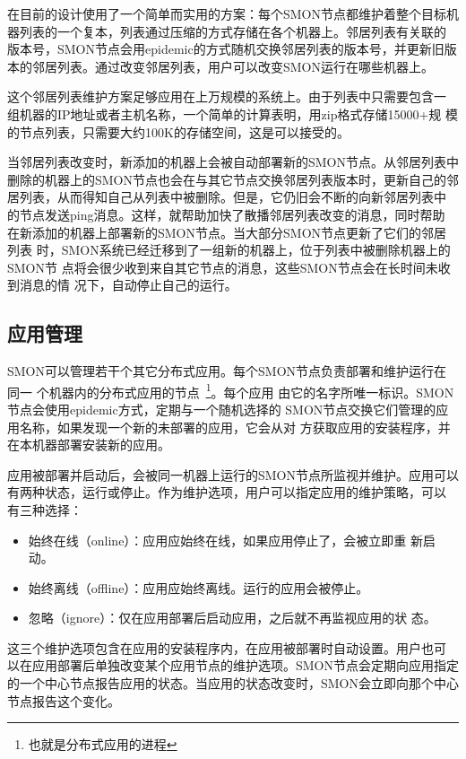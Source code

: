 在目前的设计使用了一个简单而实用的方案：每个SMON节点都维护着整个目标机
器列表的一个复本，列表通过压缩的方式存储在各个机器上。邻居列表有关联的
版本号，SMON节点会用epidemic的方式随机交换邻居列表的版本号，并更新旧版
本的邻居列表。通过改变邻居列表，用户可以改变SMON运行在哪些机器上。

这个邻居列表维护方案足够应用在上万规模的系统上。由于列表中只需要包含一
组机器的IP地址或者主机名称，一个简单的计算表明，用zip格式存储15000+规
模的节点列表，只需要大约100K的存储空间，这是可以接受的。

当邻居列表改变时，新添加的机器上会被自动部署新的SMON节点。从邻居列表中
删除的机器上的SMON节点也会在与其它节点交换邻居列表版本时，更新自己的邻
居列表，从而得知自己从列表中被删除。但是，它仍旧会不断的向新邻居列表中
的节点发送ping消息。这样，就帮助加快了散播邻居列表改变的消息，同时帮助
在新添加的机器上部署新的SMON节点。当大部分SMON节点更新了它们的邻居列表
时，SMON系统已经迁移到了一组新的机器上，位于列表中被删除机器上的SMON节
点将会很少收到来自其它节点的消息，这些SMON节点会在长时间未收到消息的情
况下，自动停止自己的运行。

\subsection{应用管理}

SMON可以管理若干个其它分布式应用。每个SMON节点负责部署和维护运行在同一
个机器内的分布式应用的节点~\footnote{也就是分布式应用的进程}。每个应用
由它的名字所唯一标识。SMON节点会使用epidemic方式，定期与一个随机选择的
SMON节点交换它们管理的应用名称，如果发现一个新的未部署的应用，它会从对
方获取应用的安装程序，并在本机器部署安装新的应用。

应用被部署并启动后，会被同一机器上运行的SMON节点所监视并维护。应用可以
有两种状态，运行或停止。作为维护选项，用户可以指定应用的维护策略，可以
有三种选择：

\begin{itemize}
  \item 始终在线（online）：应用应始终在线，如果应用停止了，会被立即重
  新启动。

  \item 始终离线（offline）：应用应始终离线。运行的应用会被停止。

  \item 忽略（ignore）：仅在应用部署后启动应用，之后就不再监视应用的状
  态。
\end{itemize}

这三个维护选项包含在应用的安装程序内，在应用被部署时自动设置。用户也可
以在应用部署后单独改变某个应用节点的维护选项。SMON节点会定期向应用指定
的一个中心节点报告应用的状态。当应用的状态改变时，SMON会立即向那个中心
节点报告这个变化。

